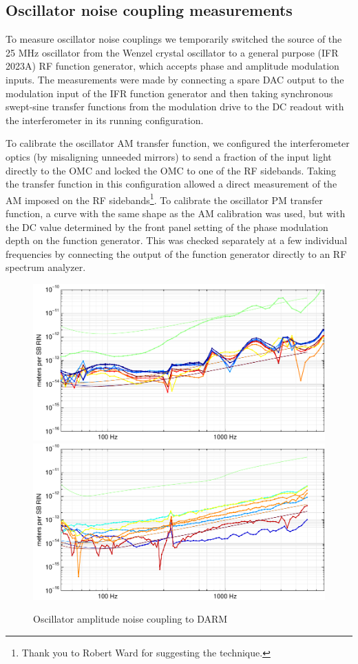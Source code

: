 \subsection{Oscillator noise coupling measurements}

To measure oscillator noise couplings we temporarily switched the
source of the 25 MHz oscillator from the Wenzel crystal oscillator to
a general purpose (IFR 2023A) RF function generator, which accepts
phase and amplitude modulation inputs.  The measurements were made by
connecting a spare DAC output to the modulation input of the IFR
function generator and then taking synchronous swept-sine transfer
functions from the modulation drive to the DC readout with the
interferometer in its running configuration.

To calibrate the oscillator AM transfer function, we configured the
interferometer optics (by misaligning unneeded mirrors) to send a
fraction of the input light directly to the OMC and locked the OMC to
one of the RF sidebands.  Taking the transfer function in this
configuration allowed a direct measurement of the AM imposed on the RF
sidebands\footnote{Thank you to Robert Ward for suggesting the
  technique.}.  To calibrate the oscillator PM transfer function, a
curve with the same shape as the AM calibration was used, but with the
DC value determined by the front panel setting of the phase modulation
depth on the function generator.  This was checked separately at a few
individual frequencies by connecting the output of the function
generator directly to an RF spectrum analyzer.

\begin{figure} %
\includegraphics[]{figures/oscAM-L1.pdf}
\includegraphics[]{figures/oscAM-H1.pdf}
\caption[Oscillator amplitude noise coupling (measured and modeled)]{\label{fig:osc-AM}Oscillator amplitude noise coupling to DARM}
\end{figure}

